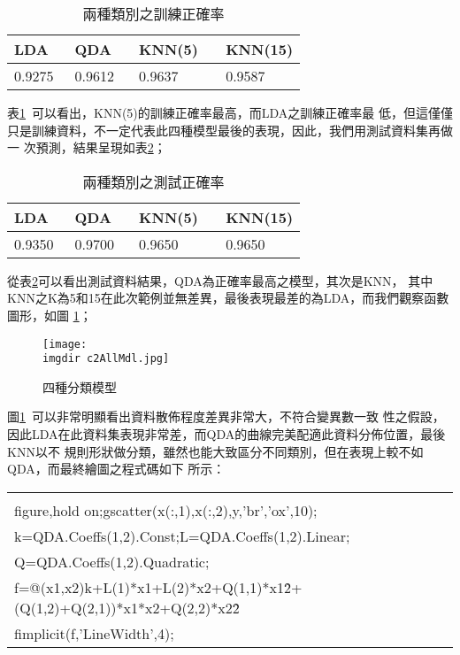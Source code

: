 \begin{enumerate}
{			\bigskip			
			\begin{table}[h]				
				\caption{兩種類別之訓練正確率}\label{table:c2trainAcc}
				\centering
				\extrarowheight=8pt
				\begin{tabular}{p{3cm} p{3cm} p{3cm} p{2cm} } 					
				\hline
				LDA\    &QDA \    &KNN(5) \ &KNN(15) \\ \hline	
				0.9275\ & 0.9612\ & 0.9637\ & 0.9587 \\
				\hline					
				\end{tabular}
			\end{table}
			\bigskip
			表\ref{table:c2trainAcc}\ 可以看出，KNN(5)的訓練正確率最高，而LDA之訓練正確率最				低，但這僅僅只是訓練資料，不一定代表此四種模型最後的表現，因此，我們用測試資料集再做一				次預測，結果呈現如表\ref{table:c2testAcc}；
			\bigskip
			\begin{table}[h]				
				\caption{兩種類別之測試正確率}\label{table:c2testAcc}
				\centering
				\extrarowheight=8pt
				\begin{tabular}{p{3cm} p{3cm} p{3cm} p{2cm} } 					
				\hline
				LDA\    &QDA \    &KNN(5) \ &KNN(15) \\ \hline	
				0.9350\ & 0.9700\ & 0.9650\ & 0.9650 \\
				\hline					
				\end{tabular}
			\end{table}
			\bigskip
			從表\ref{table:c2testAcc}可以看出測試資料結果，QDA為正確率最高之模型，其次是KNN，				其中KNN之K為5和15在此次範例並無差異，最後表現最差的為LDA，而我們觀察函數圖形，如圖					\ref{fig:c2AllMdl}；
			\begin{figure}[H]	
		 		\centering	 			 	 
   				\texttt{[image: \\imgdir c2AllMdl.jpg]} 
   				\caption{四種分類模型}   		
   		 		\label{fig:c2AllMdl}   			 		 
			\end{figure}
			圖\ref{fig:c2AllMdl}\ 可以非常明顯看出資料散佈程度差異非常大，不符合變異數一致					性之假設，因此LDA在此資料集表現非常差，而QDA的曲線完美配適此資料分佈位置，最後KNN以不				規則形狀做分類，雖然也能大致區分不同類別，但在表現上較不如QDA，而最終繪圖之程式碼如下				所示：
			\begin{center}\colorbox{slight}{
				\begin{tabular}{p{}}
					\MJHmarker{\textbf{\color{darkblue}{MATLAB語法 :}}}\\
					figure,hold on;gscatter(x(:,1),x(:,2),y,'br','ox',10);\\
					k=QDA.Coeffs(1,2).Const;L=QDA.Coeffs(1,2).Linear;\\
					Q=QDA.Coeffs(1,2).Quadratic;\\					
					f=@(x1,x2)k+L(1)*x1+L(2)*x2+Q(1,1)*x1\^2+(Q(1,2)+Q(2,1))*x1*x2+Q(2,2)*x2\^2\\
					fimplicit(f,'LineWidth',4);\\


\end{tabular}}
\end{center}}
\end{enumerate}
